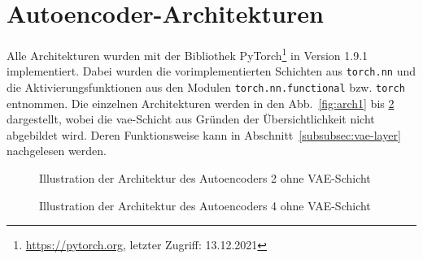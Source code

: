 \section{Autoencoder-Architekturen}
Alle Architekturen wurden mit der Bibliothek PyTorch\footnote{\url{https://pytorch.org}, letzter Zugriff: 13.12.2021} in Version 1.9.1 implementiert. Dabei wurden die vorimplementierten Schichten aus \texttt{torch.nn} und die Aktivierungsfunktionen aus den Modulen \texttt{torch.nn.functional} bzw. \texttt{torch} entnommen. Die einzelnen Architekturen werden in den Abb.~\ref{fig:arch1} bis \ref{fig:arch4} dargestellt, wobei die \gls{vae}-Schicht aus Gründen der Übersichtlichkeit nicht abgebildet wird. Deren Funktionsweise kann in Abschnitt~\ref{subsubsec:vae-layer} nachgelesen werden.

\begin{figure}
    \centering
    \begin{minipage}{0.45\textwidth}
        \centering
        \scalebox{0.75}{}
        \caption{Illustration der Architektur des Autoencoders 1 ohne VAE-Schicht}
        \label{fig:arch1}
    \end{minipage}\hfill
    \begin{minipage}{0.45\textwidth}
        \centering
        \scalebox{0.75}{}
        \caption{Illustration der Architektur des Autoencoders 2 ohne VAE-Schicht}
        \label{fig:arch2}
    \end{minipage}
\end{figure}

\begin{figure}
    \centering
    \begin{minipage}{0.45\textwidth}
        \centering
        \scalebox{0.75}{}
        \caption{Illustration der Architektur des Autoencoders 3 ohne VAE-Schicht}
        \label{fig:arch3}
    \end{minipage}\hfill
    \begin{minipage}{0.45\textwidth}
        \centering
        \scalebox{0.75}{}
        \caption{Illustration der Architektur des Autoencoders 4 ohne VAE-Schicht}
        \label{fig:arch4}
    \end{minipage}
\end{figure}

